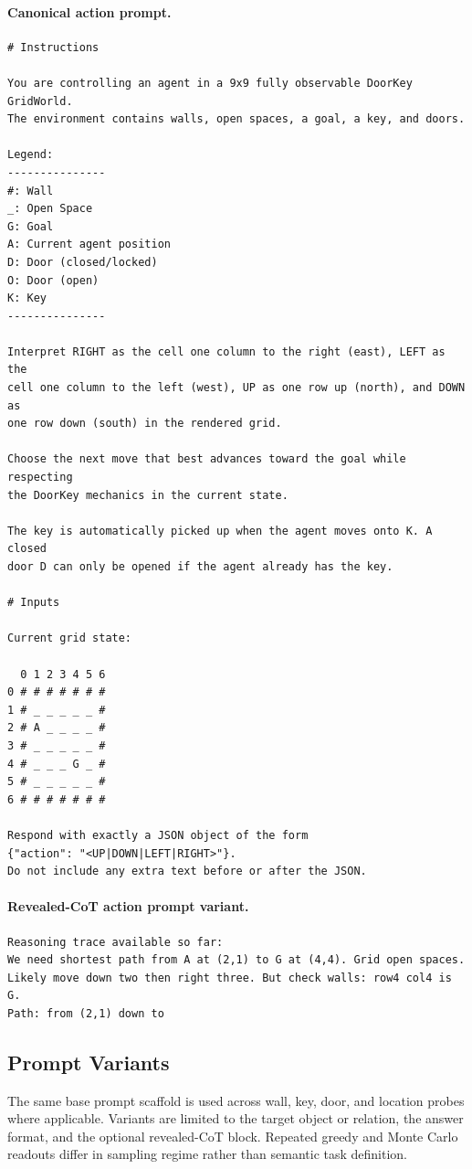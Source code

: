 \documentclass[11pt,a4paper]{article}
\begin{document}
\paragraph{Canonical action prompt.}
\begin{verbatim}
# Instructions

You are controlling an agent in a 9x9 fully observable DoorKey GridWorld.
The environment contains walls, open spaces, a goal, a key, and doors.

Legend:
---------------
#: Wall
_: Open Space
G: Goal
A: Current agent position
D: Door (closed/locked)
O: Door (open)
K: Key
---------------

Interpret RIGHT as the cell one column to the right (east), LEFT as the
cell one column to the left (west), UP as one row up (north), and DOWN as
one row down (south) in the rendered grid.

Choose the next move that best advances toward the goal while respecting
the DoorKey mechanics in the current state.

The key is automatically picked up when the agent moves onto K. A closed
door D can only be opened if the agent already has the key.

# Inputs

Current grid state:

  0 1 2 3 4 5 6
0 # # # # # # #
1 # _ _ _ _ _ #
2 # A _ _ _ _ #
3 # _ _ _ _ _ #
4 # _ _ _ G _ #
5 # _ _ _ _ _ #
6 # # # # # # #

Respond with exactly a JSON object of the form
{"action": "<UP|DOWN|LEFT|RIGHT>"}.
Do not include any extra text before or after the JSON.
\end{verbatim}

\paragraph{Revealed-CoT action prompt variant.}
\begin{verbatim}
Reasoning trace available so far:
We need shortest path from A at (2,1) to G at (4,4). Grid open spaces.
Likely move down two then right three. But check walls: row4 col4 is G.
Path: from (2,1) down to
\end{verbatim}

\subsection{Prompt Variants}
The same base prompt scaffold is used across wall, key, door, and location probes where applicable. Variants are limited to the target object or relation, the answer format, and the optional revealed-CoT block. Repeated greedy and Monte Carlo readouts differ in sampling regime rather than semantic task definition.
\end{document}
